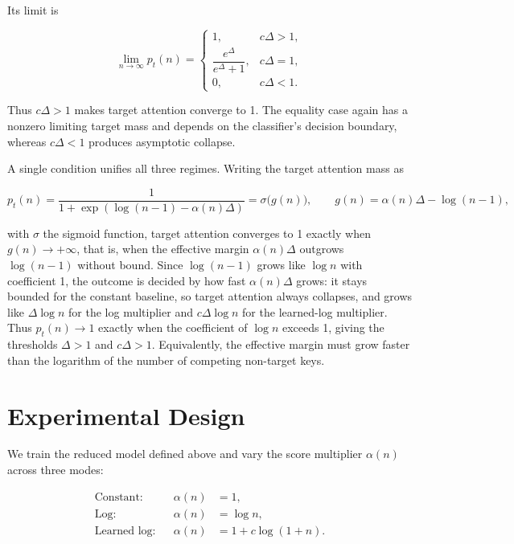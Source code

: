 \documentclass{article}
\begin{document}
Its limit is

\begin{equation}
  \lim_{n\to\infty}p_t(n)
  =
  \begin{cases}
    1, & c\Delta>1,\\
    \dfrac{e^\Delta}{e^\Delta+1}, & c\Delta=1,\\
    0, & c\Delta<1.
  \end{cases}
  \label{eq:learned-log-limit}
\end{equation}

Thus $c\Delta>1$ makes target attention converge to 1. The equality case again
has a nonzero limiting target mass and depends on the classifier's decision
boundary, whereas $c\Delta<1$ produces asymptotic collapse.

A single condition unifies all three regimes. Writing the target attention mass
as

\begin{equation}
  p_t(n)
  =
  \frac{1}{1+\exp\!\left(\log(n-1)-\alpha(n)\Delta\right)}
  =\sigma\bigl(g(n)\bigr),
  \qquad
  g(n)=\alpha(n)\Delta-\log(n-1),
  \label{eq:general-gap}
\end{equation}

with $\sigma$ the sigmoid function, target attention converges to 1 exactly
when $g(n)\to+\infty$, that is, when the effective margin
$\alpha(n)\Delta$ outgrows $\log(n-1)$ without bound. Since $\log(n-1)$ grows
like $\log n$ with coefficient 1, the outcome is decided by how fast
$\alpha(n)\Delta$ grows: it stays bounded for the constant baseline, so target
attention always collapses, and grows like $\Delta\log n$ for the log
multiplier and $c\Delta\log n$ for the learned-log multiplier. Thus
$p_t(n)\to1$ exactly when the coefficient of $\log n$ exceeds 1, giving the
thresholds $\Delta>1$ and $c\Delta>1$. Equivalently, the effective margin must
grow faster than the logarithm of the number of competing non-target keys.

\section{Experimental Design}
\label{sec:experimental-design}

We train the reduced model defined above and vary the score multiplier
$\alpha(n)$ across three modes:

\[
  \begin{aligned}
    \text{Constant}:    && \alpha(n) &= 1,\\
    \text{Log}:         && \alpha(n) &= \log n,\\
    \text{Learned log}: && \alpha(n) &= 1+c\log(1+n).
  \end{aligned}
\]
\end{document}
